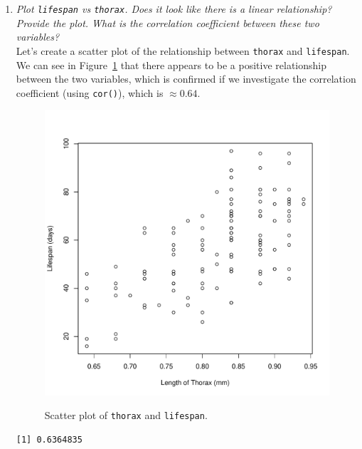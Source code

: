 \documentclass[12pt,letterpaper]{article}
\begin{document}
\begin{enumerate}[label=(\alph*)]
	\item	\emph{Plot \texttt{lifespan} vs \texttt{thorax}. Does it look like there is a linear relationship? Provide the plot. What is the correlation coefficient between these two variables?}\\
	
	 \vspace{.15cm}
	Let's create a scatter plot of the relationship between \texttt{thorax} and \texttt{lifespan}. We can see in Figure~\ref{fig:plot3_b} that there appears to be a positive relationship between the two variables, which is confirmed if we investigate the correlation coefficient (using \texttt{cor()}), which is $\approx 0.64$.
 \vspace{.15cm}
  
	
\begin{figure}[h!]\centering
	\caption{\footnotesize Scatter plot of \texttt{thorax} and \texttt{lifespan}.
	}\vspace{-1cm}
	\label{fig:plot3_b}
	\includegraphics[width=.75\textwidth]{plot3_b.pdf}\\
\end{figure}

\vspace{.25cm}

  

		\begin{verbatim}
[1] 0.6364835
		\end{verbatim}


\end{enumerate}
\end{document}
